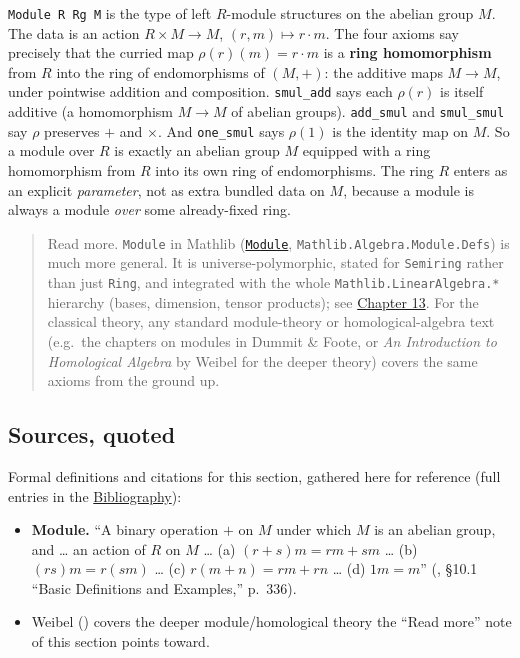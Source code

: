 \begin{mathreading}

\texttt{Module R Rg M} is the type of left \(R\)-module structures on the abelian group \(M\). The data is an action \(R \times M \to M\), \((r,m)\mapsto r\cdot m\). The four axioms say precisely that the curried map \(\rho(r)(m) = r\cdot m\) is a \textbf{ring homomorphism} from \(R\) into the ring of endomorphisms of \((M,+)\): the additive maps \(M \to M\), under pointwise addition and composition. \texttt{smul\_\allowbreak{}add} says each \(\rho(r)\) is itself additive (a homomorphism \(M \to M\) of abelian groups). \texttt{add\_\allowbreak{}smul} and \texttt{smul\_\allowbreak{}smul} say \(\rho\) preserves \(+\) and \(\times\). And \texttt{one\_\allowbreak{}smul} says \(\rho(1)\) is the identity map on \(M\). So a module over \(R\) is exactly an abelian group \(M\) equipped with a ring homomorphism from \(R\) into its own ring of endomorphisms. The ring \(R\) enters as an explicit \emph{parameter}, not as extra bundled data on \(M\), because a module is always a module \emph{over} some already-fixed ring.

\end{mathreading}

\begin{quote}
Read more. \texttt{Module} in Mathlib (\href{https://loogle.lean-lang.org/?q=Module}{\texttt{Module}}, \texttt{Mathlib.Algebra.Module.Defs}) is much more general. It is universe-polymorphic, stated for \texttt{Semiring} rather than just \texttt{Ring}, and integrated with the whole \texttt{Mathlib.LinearAlgebra.*} hierarchy (bases, dimension, tensor products); see \hyperref[sec:13-next-steps:02-moving-to-mathlib:1]{Chapter 13}. For the classical theory, any standard module-theory or homological-algebra text (e.g.~the chapters on modules in Dummit \& Foote, or \emph{An Introduction to Homological Algebra} by Weibel for the deeper theory) covers the same axioms from the ground up.
\end{quote}

\subsection{Sources, quoted}\label{sec:10-modules:02-translating-into-lean:2}

Formal definitions and citations for this section, gathered here for reference (full entries in the \hyperref[sec:root:bibliography:1]{Bibliography}):

\begin{itemize}
\tightlist
\item
  \textbf{Module.} ``A binary operation \(+\) on \(M\) under which \(M\) is an abelian group, and \ldots{} an action of \(R\) on \(M\) \ldots{} (a) \((r+s)m = rm+sm\) \ldots{} (b) \((rs)m = r(sm)\) \ldots{} (c) \(r(m+n) = rm+rn\) \ldots{} (d) \(1m = m\)'' (\cite{DummitFoote2003}, §10.1 ``Basic Definitions and Examples,'' p.~336).
\item
  Weibel (\cite{Weibel1994}) covers the deeper module/homological theory the ``Read more'' note of this section points toward.
\end{itemize}
